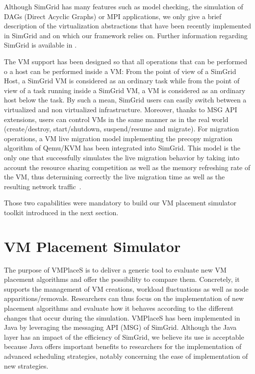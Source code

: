 \documentclass[conference]{IEEEtran}
\newcommand{\sg}{SimGrid\xspace}
\newcommand{\vmps}{VMPlaceS\xspace}
\begin{document}
Although SimGrid has many features such as model checking, the
simulation of DAGs (Direct Acyclic Graphs) or MPI applications, we
only give a brief description of the  virtualization  abstractions
that have been recently implemented in \sg and on which our framework relies
on.  Further information regarding \sg is available in \cite{casanova:hal-01017319}.

The VM support has been designed so that all operations that can be performed
o a host can be performed inside a VM: From the point of view of a \sg
Host, a \sg VM is considered as an ordinary task while from the point
of view of a task running inside a \sg VM, a VM is considered as an
ordinary host below the task.  By such a mean, \sg users can easily
switch between a virtualized and non virtualized infrastructure.
Moreover, thanks to  MSG API extensions, users can control VMs in the
same manner as in the real world (\eg create/destroy, start/shutdown,
suspend/resume and migrate).
For migration operations, a VM live migration model implementing the
precopy migration algorithm of Qemu/KVM has been integrated into \sg.
This model is the only one that successfully simulates the live
migration behavior by taking into account the resource sharing
competition as well as the memory refreshing rate of the VM, thus
determining correctly the live migration time as well as the resulting
network traffic~\cite{Hirofuchi:2013:ALM:2568486.2568524}.

Those two capabilities were mandatory to build our VM placement
simulator toolkit introduced in the next section.

\section{VM Placement Simulator}
\label{sec:injector}

The purpose of \vmps is to deliver a generic tool to evaluate new VM
placement algorithms and offer the possibility to compare
them. Concretely, it supports the management of VM creations, workload
fluctuations as well as node apparitions/removals.  Researchers can
thus focus on the implementation of new placement algorithms and
evaluate how it behaves according to the different changes that occur
during the simulation.
%
\vmps has been implemented in Java by leveraging the messaging API
(MSG) of \sg.  Although the Java layer has an impact of the efficiency
of \sg, we believe its use is acceptable because Java offers important
benefits to researchers for the implementation of advanced scheduling
strategies, notably concerning the ease of implementation of new
strategies. 
\end{document}

